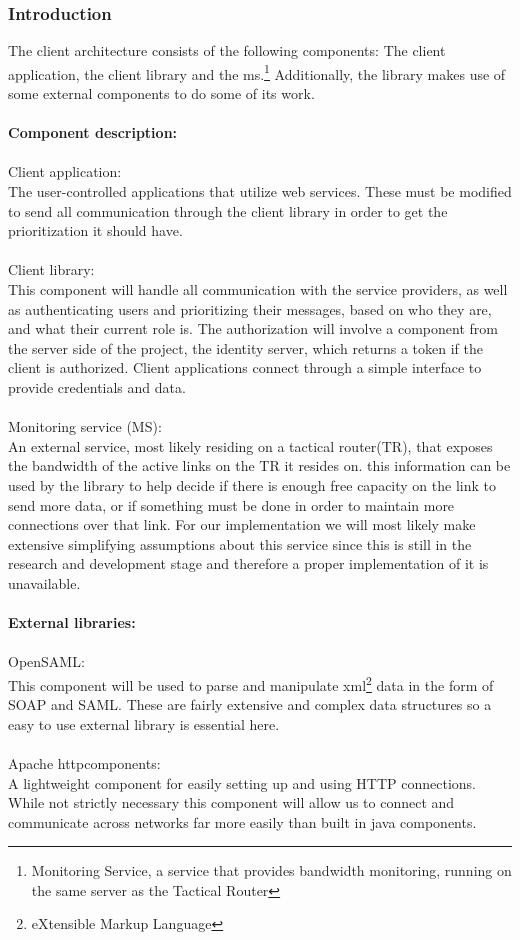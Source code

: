     \subsubsection{Introduction}\label{client introduction}
The client architecture consists of the following components: The client application, the client library and the \gls{ms}.\footnote{Monitoring Service, a service that provides bandwidth monitoring, running on the same server as the Tactical Router} Additionally, the library makes use of some external components to do some of its work.
\\\\
\textbf{Component description:}
\\\\
Client application:\\
	The user-controlled applications that utilize web services. These must be modified to send all communication through the client library in order to get the prioritization it should have.
\\\\
Client library:\\
This component will handle all communication with the service providers, as well as authenticating users and prioritizing their messages, based on who they are, and what their current role is. The authorization will involve a component from the server side of the project, the identity server, which returns a token if the client is authorized. Client applications connect through a simple interface to provide credentials and data.
\\\\
Monitoring service (MS):\\
An external service, most likely residing on a tactical router(TR), that exposes the bandwidth of the active links on the TR it resides on. this information can be used by the library to help decide  if there is enough free capacity on the link to send more data, or if something must be done in order to maintain more connections over that link.
For our implementation we will most likely make extensive simplifying assumptions about this service since this is still in the research and development stage and therefore a proper implementation of it is unavailable. 
\\\\
\textbf{External libraries:}
\\\\
OpenSAML:\\
This component will be used to parse and manipulate \gls{xml}\footnote{eXtensible Markup Language} data in the form of SOAP and SAML. These are fairly extensive and complex data structures so a easy to use external library is essential here.
\\\\
Apache \gls{httpcomponents}:\\
A lightweight component for easily setting up and using HTTP connections.
While not strictly necessary this component will allow us to connect and communicate across networks far more easily than built in java components.

